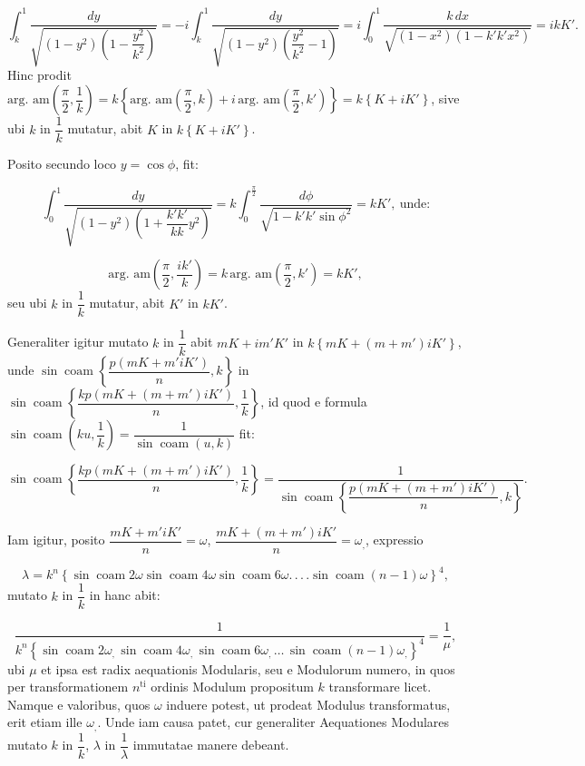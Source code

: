 \documentclass{article}
\begin{document}
\[
\int_{k}^{1}\frac{dy}{\sqrt{(1-y^{2})\left(1-\dfrac{y^{2}}{k^{2}}\right)}}=-i\int_{k}^{1}\frac{dy}{\sqrt{(1-y^{2})\left(\dfrac{y^{2}}{k^{2}}-1\right)}}=i\int_{0}^{1}\frac{k\,dx}{\sqrt{(1-x^{2})(1-k'k'x^{2})}}=ikK'.
\]
Hinc prodit $\text{arg.\ am}\left(\dfrac{\pi}{2},\dfrac{1}{k}\right)=k\left\{\text{arg.\ am}\left(\dfrac{\pi}{2},k\right)+i\,\text{arg.\ am}\left(\dfrac{\pi}{2},k'\right)\right\}=k\left\{K+iK'\right\}$, sive ubi $k$ in $\dfrac{1}{k}$ mutatur, abit $K$ in $k\left\{K+iK'\right\}$.

Posito secundo loco $y=\cos\phi$, fit:

\[
\int_{0}^{1}\frac{dy}{\sqrt{(1-y^{2})\left(1+\dfrac{k'k'}{kk}y^{2}\right)}}=k\int_{0}^{\frac{\pi}{2}}\frac{d\phi}{\sqrt{1-k'k'\sin\phi^{2}}}=kK',\ \text{unde:}
\]

\[
\text{arg.\ am}\left(\frac{\pi}{2},\frac{ik'}{k}\right)=k\,\text{arg.\ am}\left(\frac{\pi}{2},k'\right)=kK',
\]
seu ubi $k$ in $\dfrac{1}{k}$ mutatur, abit $K'$ in $kK'$.

Generaliter igitur mutato $k$ in $\dfrac{1}{k}$ abit $mK+im'K'$ in $k\left\{mK+(m+m')iK'\right\}$, unde $\sin\operatorname{coam}\left\{\dfrac{p(mK+m'iK')}{n},k\right\}$ in $\sin\operatorname{coam}\left\{\dfrac{kp\left(mK+(m+m')iK'\right)}{n},\dfrac{1}{k}\right\}$, id quod e formula $\sin\operatorname{coam}\left(ku,\dfrac{1}{k}\right)=\dfrac{1}{\sin\operatorname{coam}(u,k)}$ fit:

\[
\sin\operatorname{coam}\left\{\frac{kp\left(mK+(m+m')iK'\right)}{n},\frac{1}{k}\right\}=\frac{1}{\sin\operatorname{coam}\left\{\dfrac{p\left(mK+(m+m')iK'\right)}{n},k\right\}}.
\]


Iam igitur, posito $\dfrac{mK+m'iK'}{n}=\omega$, $\dfrac{mK+(m+m')iK'}{n}=\omega_{,}$, expressio

\[
\lambda=k^{n}\left\{\sin\operatorname{coam}2\omega\sin\operatorname{coam}4\omega\sin\operatorname{coam}6\omega.\,.\,.\,.\sin\operatorname{coam}(n-1)\omega\right\}^{4},
\]
mutato $k$ in $\dfrac{1}{k}$ in hanc abit:

\[
\frac{1}{k^{n}\left\{\sin\operatorname{coam}2\omega_{,}\,\sin\operatorname{coam}4\omega_{,}\,\sin\operatorname{coam}6\omega_{,}\,\ldots\,\sin\operatorname{coam}(n-1)\omega_{,}\right\}^{4}}=\frac{1}{\mu},
\]
ubi $\mu$ et ipsa est radix aequationis Modularis, seu e Modulorum numero, in quos per transformationem $n^{\mathrm{ti}}$ ordinis Modulum propositum $k$ transformare licet. Namque e valoribus, quos $\omega$ induere potest, ut prodeat Modulus transformatus, erit etiam ille $\omega_{,}$. Unde iam causa patet, cur generaliter Aequationes Modulares mutato $k$ in $\dfrac{1}{k}$, $\lambda$ in $\dfrac{1}{\lambda}$ immutatae manere debeant.
\end{document}
